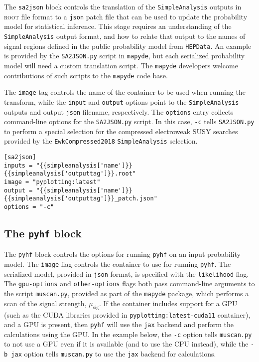 \documentclass{article}
\newcommand{\mapyde}{\texttt{mapyde}}
\newcommand{\simpleanalysis}{\texttt{SimpleAnalysis}}
\newcommand{\pyhf}{\texttt{pyhf}}
\newcommand{\musig}{\ensuremath{\mu_{\mathrm{sig}}}}
\newcommand{\hepdata}{\texttt{HEPData}}
\newcommand{\ROOT}{\textsc{root}}
\newcommand{\json}{\texttt{json}}
\newcommand{\toml}{\textsc{toml}}
\begin{document}
The \texttt{sa2json} block controls the translation of the \simpleanalysis{} outputs in \ROOT{} file format to a \json{} patch file that can be used to update the probability model for statistical inference.  This stage requires an understanding of the \simpleanalysis{} output format, and how to relate that output to the names of signal regions defined in the public probability model from \hepdata.  An example is provided by the \texttt{SA2JSON.py} script in \mapyde, but each serialized probability model will need a custom translation script.  The \mapyde{} developers welcome contributions of such scripts to the \mapyde{} code base.

The \texttt{image} tag controls the name of the container to be used when running the transform, while the \texttt{input} and \texttt{output} options point to the \simpleanalysis{} outputs and output \json{} filename, respectively.  The \texttt{options} entry collects command-line options for the \texttt{SA2JSON.py} script.  In this case, \texttt{-c} tells \texttt{SA2JSON.py} to perform a special selection for the compressed electroweak SUSY searches provided by the \texttt{EwkCompressed2018} \simpleanalysis{} selection.

\begin{listing}[H]
	\begin{verbatim}
[sa2json]
inputs = "{{simpleanalysis['name']}}{{simpleanalysis['outputtag']}}.root"
image = "pyplotting:latest"
output = "{{simpleanalysis['name']}}{{simpleanalysis['outputtag']}}_patch.json"
options = "-c"
        \end{verbatim}
	\caption{The \texttt{sa2json} block of an example \toml{} configuration file for generating slepton events.}
	\label{slepton-config-sa2json}
\end{listing}

\subsection{The \texttt{pyhf} block}
\label{ssec:the-pyhf-block}

The \texttt{pyhf} block controls the options for running \pyhf{} on an input probability model.  The \texttt{image} flag controls the container to use for running \pyhf.  The serialized model, provided in \json{} format, is specified with the \texttt{likelihood} flag.  The \texttt{gpu-options} and \texttt{other-options} flags both pass command-line arguments to the script \texttt{muscan.py}, provided as part of the \mapyde{} package, which performs a scan of the signal strength, \musig.  If the container includes support for a GPU (such as the CUDA libraries provided in \texttt{pyplotting:latest-cuda11} container), and a GPU is present, then \pyhf{} will use the \texttt{jax} backend and perform the calculations using the GPU.  In the example below, the \texttt{-c} option tells \texttt{muscan.py} to not use a GPU even if it is available (and to use the CPU instead), while the \texttt{-b jax} option tells \texttt{muscan.py} to use the \texttt{jax} backend for calculations.
\end{document}
